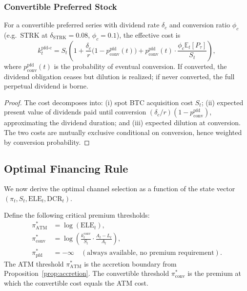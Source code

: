 \subsubsection{Convertible Preferred Stock}

\begin{proposition}\label{prop:cost_pfd_c}
For a convertible preferred series with dividend rate $\delta_c$ and
conversion ratio $\phi_c$ (e.g.\ STRK at $\delta_{\mathrm{STRK}} = 0.08$,
$\phi_c = 0.1$), the effective cost is
\begin{equation}\label{eq:k_pfd_c}
  k_t^{\mathrm{pfd\text{-}c}}
  = S_t \left(1
    + \frac{\delta_c}{r}\bigl(1 - p_{\mathrm{conv}}^{\mathrm{pfd}}(t)\bigr)
    + p_{\mathrm{conv}}^{\mathrm{pfd}}(t) \cdot
      \frac{\phi_c \mathbb{E}_t[P_\tau]}{S_t}
    \right),
\end{equation}
where $p_{\mathrm{conv}}^{\mathrm{pfd}}(t)$ is the probability of eventual
conversion.  If converted, the dividend obligation ceases but dilution is
realized; if never converted, the full perpetual dividend is borne.
\end{proposition}

\begin{proof}
The cost decomposes into: (i) spot BTC acquisition cost $S_t$; (ii)
expected present value of dividends paid until conversion
$(\delta_c/r)(1 - p_{\mathrm{conv}}^{\mathrm{pfd}})$, approximating the
dividend duration; and (iii) expected dilution at conversion.  The two
costs are mutually exclusive conditional on conversion, hence weighted
by conversion probability.
\end{proof}

\subsection{Optimal Financing Rule}\label{subsec:optimal_rule}

We now derive the optimal channel selection as a function of the state
vector $(\pi_t, S_t, \mathrm{ELE}_t, \mathrm{DCR}_t)$.

\begin{definition}\label{def:thresholds}
Define the following critical premium thresholds:
\begin{align}
  \pi^*_{\mathrm{ATM}} &= \log(\mathrm{ELE}_t),
    \label{eq:pi_atm_thresh} \\
  \pi^*_{\mathrm{conv}} &= \log\!\left(\frac{k_t^{\mathrm{conv}}}{S_t}
    \cdot \frac{A_t - L_t}{A_t}\right),
    \label{eq:pi_conv_thresh} \\
  \pi^*_{\mathrm{pfd}} &= -\infty \quad (\text{always available, no premium
    requirement}).
    \label{eq:pi_pfd_thresh}
\end{align}
The ATM threshold $\pi^*_{\mathrm{ATM}}$ is the accretion boundary from
Proposition~\ref{prop:accretion}.  The convertible threshold
$\pi^*_{\mathrm{conv}}$ is the premium at which the convertible cost equals
the ATM cost.
\end{definition}

